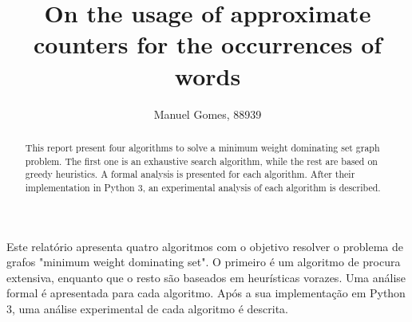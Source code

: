 \documentclass[shortpaper,english,final]{revdetua}
\begin{document}

\title{On the usage of approximate counters for the occurrences of words}
\author{Manuel Gomes, 88939} %
\maketitle

\begin{abstract}%
This report present four algorithms to solve a minimum weight dominating set graph problem.
The first one is an exhaustive search algorithm, while the rest are based on greedy heuristics.
A formal analysis is presented for each algorithm.
After their implementation in Python 3, an experimental analysis of each algorithm is described.
\end{abstract}

\begin{resumo}%
Este relatório apresenta quatro algoritmos com o objetivo resolver o problema de grafos "minimum weight dominating set".
O primeiro é um algoritmo de procura extensiva, enquanto que o resto são baseados em heurísticas vorazes.
Uma análise formal é apresentada para cada algoritmo.
Após a sua implementação em Python 3, uma análise experimental de cada algoritmo é descrita.
\end{resumo}









% 
\end{document}
